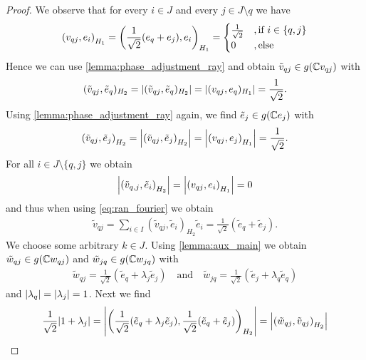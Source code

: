 \begin{proof}
	We observe that for every $i \in J$ and every $j \in J \setminus q$ we have
	\begin{align*}
		{\left ( v_{qj}, e_i \right )}_{H_1} = {\left ( \frac{1}{\sqrt{2}}(e_q + e_j), e_i \right )}_{H_1} =
		\begin{cases}
			\frac{1}{\sqrt{2}} &, \text{if } i \in \{q,j\} \\
			0 &, \text{else}
		\end{cases}
	\end{align*}
	Hence we can use \ref{lemma:phase_adjustment_ray} and obtain $\tilde{v}_{qj} \in g(\mathbb{C} v_{qj})$ with
	\begin{align*}
		(\tilde{v}_{qj}, \tilde{e}_q)_{H_2} = {\left | (\tilde{v}_{qj}, \tilde{e}_q)_{H_2} \right |} = {\left | (v_{qj}, e_q)_{H_1} \right |} = \frac{1}{\sqrt{2}}.
	\end{align*}
	Using \ref{lemma:phase_adjustment_ray} again, we find $\tilde{e}_{j} \in g(\mathbb{C} e_j)$ with
	\begin{align*}
		{\left ( \tilde{v}_{qj}, \tilde{e}_j \right )}_{H_2} = {\left | {\left ( \tilde{v}_{qj}, \tilde{e}_j \right )}_{H_2} \right |} = {\left | {\left ( v_{qj}, e_j \right )}_{H_1} \right |} = \frac{1}{\sqrt{2}}.
	\end{align*}
	For all $i \in J \setminus \{q, j\}$ we obtain
	\begin{align*}
		{\left | {\left ( \tilde{v}_{q,j}, \tilde{e}_i \right )}_{H_2} \right |} = {\left | {\left ( v_{qj}, e_i \right )}_{H_1} \right |} = 0
	\end{align*}
	and thus when using \eqref{eq:ran_fourier} we obtain
	\begin{align*}
		\tilde{v}_{qj} = \sum_{i \in I} (\tilde{v}_{qj}, \tilde{e}_i)_{H_2} \tilde{e}_i = \frac{1}{\sqrt{2}} (\tilde{e}_q + \tilde{e}_j).
	\end{align*}
	We choose some arbitrary $k \in J$. Using \ref{lemma:aux_main} we obtain $\tilde{w}_{qj} \in g(\mathbb{C} w_{qj})$ and $\tilde{w}_{jq} \in g(\mathbb{C} w_{jq})$ with
	\begin{align*}
		\tilde{w}_{qj} = \frac{1}{\sqrt{2}}(\tilde{e}_q + \lambda_j \tilde{e}_j) \quad \text{and} \quad \tilde{w}_{jq} = \frac{1}{\sqrt{2}}(\tilde{e}_j + \lambda_{q} \tilde{e}_q)
	\end{align*}
	and ${\left | \lambda_q \right |} = {\left | \lambda_j \right |} = 1$. Next we find
	\begin{align*}
		\frac{1}{\sqrt{2}}\vbraces{1 + \lambda_j} &= \vbraces{\pbraces{\frac{1}{\sqrt{2}}(\tilde{e}_q + \lambda_j \tilde{e}_j), \frac{1}{\sqrt{2}} (\tilde{e}_q + \tilde{e}_j)}_{H_2}} = \vbraces{\pbraces{\tilde{w}_{qj}, \tilde{v}_{qj}}_{H_2}} \\

\end{align*}
\end{proof}
